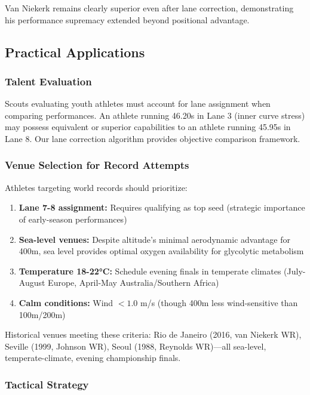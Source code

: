 \documentclass[12pt]{article}
\begin{document}
Van Niekerk remains clearly superior even after lane correction, demonstrating his performance supremacy extended beyond positional advantage.

\subsection{Practical Applications}

\subsubsection{Talent Evaluation}

Scouts evaluating youth athletes must account for lane assignment when comparing performances. An athlete running 46.20s in Lane 3 (inner curve stress) may possess equivalent or superior capabilities to an athlete running 45.95s in Lane 8. Our lane correction algorithm provides objective comparison framework.

\subsubsection{Venue Selection for Record Attempts}

Athletes targeting world records should prioritize:
\begin{enumerate}
    \item \textbf{Lane 7-8 assignment:} Requires qualifying as top seed (strategic importance of early-season performances)
    \item \textbf{Sea-level venues:} Despite altitude's minimal aerodynamic advantage for 400m, sea level provides optimal oxygen availability for glycolytic metabolism
    \item \textbf{Temperature 18-22°C:} Schedule evening finals in temperate climates (July-August Europe, April-May Australia/Southern Africa)
    \item \textbf{Calm conditions:} Wind $<1.0$ m/s (though 400m less wind-sensitive than 100m/200m)
\end{enumerate}

Historical venues meeting these criteria: Rio de Janeiro (2016, van Niekerk WR), Seville (1999, Johnson WR), Seoul (1988, Reynolds WR)—all sea-level, temperate-climate, evening championship finals.

\subsubsection{Tactical Strategy}
\end{document}
